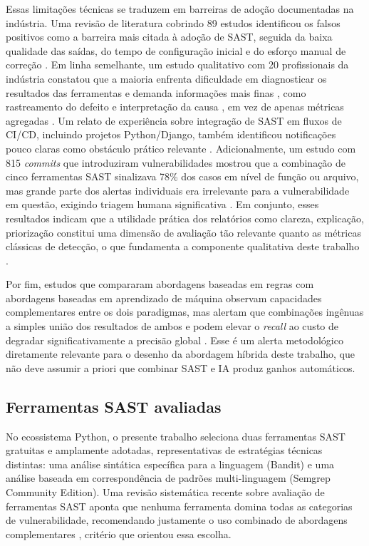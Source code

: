 Essas limitações técnicas se traduzem em barreiras de adoção documentadas na indústria. Uma revisão de literatura cobrindo 89 estudos identificou os falsos positivos como a barreira mais citada à adoção de SAST, seguida da baixa qualidade das saídas, do tempo de configuração inicial e do esforço manual de correção \cite{Wadhams2024SASTBarriers}. Em linha semelhante, um estudo qualitativo com 20 profissionais da indústria constatou que a maioria enfrenta dificuldade em diagnosticar os resultados das ferramentas e demanda informações mais finas , como rastreamento do defeito e interpretação da causa , em vez de apenas métricas agregadas \cite{Li2025IndustrySAST}. Um relato de experiência sobre integração de SAST em fluxos de CI/CD, incluindo projetos Python/Django, também identificou notificações pouco claras como obstáculo prático relevante \cite{Chembakottu2025SASTUsability}. Adicionalmente, um estudo com 815 \textit{commits} que introduziram vulnerabilidades mostrou que a combinação de cinco ferramentas SAST sinalizava 78\% dos casos em nível de função ou arquivo, mas grande parte dos alertas individuais era irrelevante para a vulnerabilidade em questão, exigindo triagem humana significativa \cite{Charoenwet2024SecureReview}. Em conjunto, esses resultados indicam que a utilidade prática dos relatórios como clareza, explicação, priorização  constitui uma dimensão de avaliação tão relevante quanto as métricas clássicas de detecção, o que fundamenta a componente qualitativa deste trabalho .

Por fim, estudos que compararam abordagens baseadas em regras com abordagens baseadas em aprendizado de máquina observam capacidades complementares entre os dois paradigmas, mas alertam que combinações ingênuas a simples união dos resultados de ambos e podem elevar o \textit{recall} ao custo de degradar significativamente a precisão global \cite{Croft2021RuleLearningSAST}. Esse é um alerta metodológico diretamente relevante para o desenho da abordagem híbrida deste trabalho, que não deve assumir a priori que combinar SAST e IA produz ganhos automáticos.


\subsection{Ferramentas SAST avaliadas}\label{subsec:ferramentas-sast}
No ecossistema Python, o presente trabalho seleciona duas ferramentas SAST gratuitas e amplamente adotadas, representativas de estratégias técnicas distintas: uma análise sintática específica para a linguagem (Bandit) e uma análise baseada em correspondência de padrões multi-linguagem (Semgrep Community Edition). Uma revisão sistemática recente sobre avaliação de ferramentas SAST aponta que nenhuma ferramenta domina todas as categorias de vulnerabilidade, recomendando justamente o uso combinado de abordagens complementares \cite{Dalaq2025SASTSLR} , critério que orientou essa escolha.


